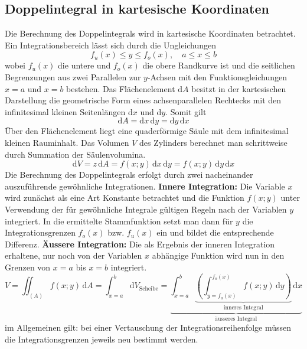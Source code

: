 \subsection{Doppelintegral in kartesische Koordinaten}
Die Berechnung des Doppelintegrals wird in kartesische Koordinaten betrachtet. Ein Integrationsbereich lässt sich durch die Ungleichungen
\begin{equation}  
\boxed{f_u\left(x\right)\leq y\leq f_o\left(x\right),\quad a\leq x\leq b}
\end{equation}
wobei $f_u\left(x\right)$ die untere und $f_o\left(x\right)$ die obere Randkurve ist und die seitlichen Begrenzungen aus zwei Parallelen zur $y$-Achsen mit den Funktionsgleichungen $x=a$ und $x=b$ bestehen. Das Flächenelement $\text{d}A$ besitzt in der kartesischen Darstellung die geometrische Form eines achsenparallelen Rechtecks mit den infinitesimal kleinen Seitenlängen $\text{d}x$ und $\text{d}y$. Somit gilt
\begin{equation}
\boxed{\text{d}A=\text{d}x\,\text{d}y=\text{d}y\,\text{d}x}
\end{equation}
Über den Flächenelement liegt eine quaderförmige Säule mit dem infinitesimal kleinen Rauminhalt. Das Volumen $V$ des Zylinders berechnet man schrittweise durch Summation der Säulenvolumina.
\begin{equation}
\boxed{\text{d}V=z\,\text{d}A=f\left(x; y\right)\,\text{d}x\,\text{d}y=f\left(x; y\right)\,\text{d}y\,\text{d}x}
\end{equation}
Die Berechnung des Doppelintegrals erfolgt durch zwei nacheinander auszuführende gewöhnliche Integrationen. 
\newline\newline
\textbf{Innere Integration:} Die Variable $x$ wird zunächst als eine Art Konstante betrachtet und die Funktion $f\left(x; y\right)$ unter Verwendung der für gewöhnliche Integrale gültigen Regeln nach der Variablen $y$ integriert. In die ermittelte Stammfunktion setzt man dann für $y$ die Integrationsgrenzen $f_o\left(x\right)$ bzw. $f_u\left(x\right)$ ein und bildet die entsprechende Differenz. 
\newline\newline
\textbf{Äussere Integration:} Die als Ergebnis der inneren Integration erhaltene, nur noch von der Variablen $x$ abhängige Funktion wird nun in den Grenzen von $x=a$ bis $x=b$ integriert.
\begin{equation}
\boxed{V=\displaystyle \iint_{\left(A\right)}f\left(x; y\right)\,\text{d}A=\displaystyle \int_{x=a}^{b}\text{d}V_{\text{Scheibe}}=\underbrace{\displaystyle \int_{x=a}^b\underbrace{\left(\displaystyle \int_{y=f_a\left(x\right)}^{f_o\left(x\right)}f\left(x; y\right)\,\text{d}y\right)}_{\text{inneres Integral}}\,\text{d}x}_{\text{äusseres Integral}}}
\end{equation}
im Allgemeinen gilt: bei einer Vertauschung der Integrationsreihenfolge müssen die Integrationsgrenzen jeweils neu bestimmt werden.
